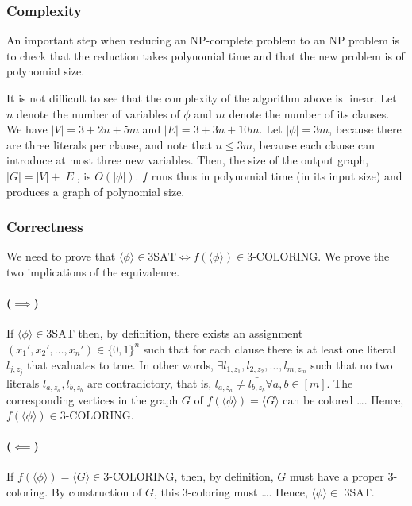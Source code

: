 \documentclass{article}
\DeclareMathOperator{\Forall}{\forall}
\newcommand{\card}[1]{|#1|}
\begin{document}
\subsubsection{Complexity}
An important step when reducing an NP-complete problem to an NP problem is to
check that the reduction takes polynomial time and that the new problem is of
polynomial size.

It is not difficult to see that the complexity of the algorithm above is
linear. Let $n$ denote the number of variables of $\phi$ and $m$ denote the
number of its clauses. We have $\card{V} = 3 + 2n + 5m$ and $\card{E} = 3 +
3n + 10m$. Let $\card{\phi} = 3m$, because there are three literals per clause,
and note that $n \le 3m$, because each clause can introduce at most three new
variables. Then, the size of the output graph, $\card{G} = \card{V} + \card{E}$,
is $O(\card{\phi})$. $f$ runs thus in polynomial time (in its input size)
and produces a graph of polynomial size.

\subsubsection{Correctness}

We need to prove that $\langle \phi \rangle \in \text{3SAT} \iff f(\langle \phi \rangle) \in
\text{3-COLORING}$. We prove the two implications of the equivalence.

\paragraph{($\implies$)} If $\langle\phi\rangle \in \text{3SAT}$ then, by definition,
there exists an assignment $(x_1', x_2', \ldots, x_n') \in \{0,1\}^n$ such
that for each clause there is at least one literal $l_{j,z_j}$ that evaluates
to true. In other words, $\exists l_{1,z_1},l_{2,z_2},\ldots,l_{m,z_m}$ such
that no two literals $l_{a,z_a},l_{b,z_b}$ are contradictory, that is,
$l_{a,z_a} \neq \bar{l_{b,z_b}} \Forall a,b \in [m]$.
%
The corresponding
vertices in the graph $G$ of $f(\langle \phi \rangle) = \langle G\rangle$
can be colored \ldots.
%
Hence, $f(\langle \phi \rangle) \in \text{3-COLORING}$.

\paragraph{($\impliedby$)} If $f(\langle \phi \rangle) = \langle G
\rangle \in \text{3-COLORING}$,
then, by definition, $G$ must have a proper 3-coloring. By
construction of $G$, this 3-coloring must \ldots.
%
Hence, $\langle \phi \rangle \in$ 3SAT.
\end{document}
